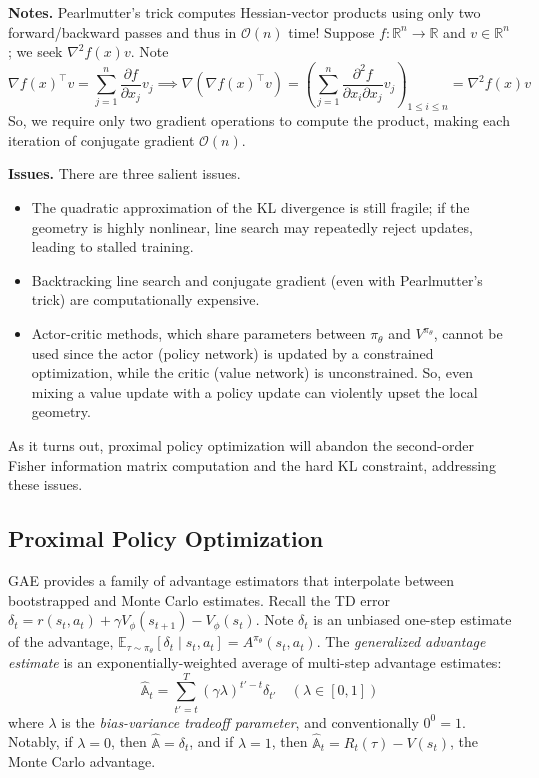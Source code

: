 \documentclass[11pt, letterpaper]{article}
\begin{document}
\begin{remark}
    \textbf{Notes.} Pearlmutter's trick computes Hessian-vector products using only two forward/backward passes and thus in \(\mathcal{O}(n)\) time! Suppose \(f : \mathbb{R}^n \to \mathbb{R}\) and \(v \in \mathbb{R}^n\); we seek \(\nabla^2 f(x) v\). Note 
    \[
        \nabla f(x)^\top v = \sum_{j=1}^n \frac{\partial f}{\partial x_j} v_j
        \implies
        \nabla (\nabla f(x)^\top v) 
        = \left( \sum_{j=1}^n \frac{\partial^2 f}{\partial x_i \partial x_j} v_j \right)_{1 \leq i \leq n}
        = \nabla^2 f(x) v
    \]
    So, we require only two gradient operations to compute the product, making each iteration of conjugate gradient \(\mathcal{O}(n)\). 

    \textbf{Issues.} There are three salient issues. 
    \begin{itemize}
        \item The quadratic approximation of the KL divergence is still fragile; if the geometry is highly nonlinear, line search may repeatedly reject updates, leading to stalled training.
        \item Backtracking line search and conjugate gradient (even with Pearlmutter's trick) are computationally expensive. 
        \item Actor-critic methods, which share parameters between \(\pi_\theta\) and \(V^{\pi_\theta}\), cannot be used since the actor (policy network) is updated by a constrained optimization, while the critic (value network) is unconstrained. So, even mixing a value update with a policy update can violently upset the local geometry. 
    \end{itemize}
    As it turns out, proximal policy optimization will abandon the second-order Fisher information matrix computation and the hard KL constraint, addressing these issues. 
\end{remark}

\newpage
\subsection{Proximal Policy Optimization}

\begin{concept}
    GAE provides a family of advantage estimators that interpolate between bootstrapped and Monte Carlo estimates. Recall the TD error \(\delta_t = r(s_t, a_t) + \gamma V_\phi(s_{t+1}) - V_\phi(s_t)\). Note \(\delta_t\) is an unbiased one-step estimate of the advantage, \(\mathbb{E}_{\tau \sim \pi_\theta}\left[\delta_t \mid s_t, a_t\right] = A^{\pi_\theta}(s_t, a_t)\). The \textit{generalized advantage estimate} is an exponentially-weighted average of multi-step advantage estimates: 
    \[
        \widehat{\mathbb{A}}_t = \sum_{t'=t}^{T} (\gamma\lambda)^{t'-t} \delta_{t'} \quad (\lambda \in [0,1])
    \]
    where \(\lambda\) is the \textit{bias-variance tradeoff parameter}, and conventionally \(0^0 = 1\). Notably, if \(\lambda=0\), then \(\widehat{\mathbb{A}} = \delta_t\), and if \(\lambda = 1\), then \(\widehat{\mathbb{A}}_t = R_t(\tau) - V(s_t)\), the Monte Carlo advantage.
\end{concept}
\end{document}

